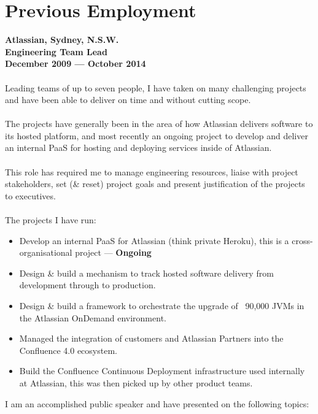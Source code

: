 \documentclass[a4paper]{article}
\begin{document}
\section*{Previous Employment}
\textbf{Atlassian, Sydney, N.S.W.\\Engineering Team Lead\\December 2009 --- October 2014}\\\\
Leading teams of up to seven people, I have taken on many challenging projects and have been able to deliver on time and without cutting scope.
\\\\The projects have generally been in the area of how Atlassian delivers software to its hosted platform, and most recently an ongoing project to develop and deliver an internal PaaS for hosting and deploying services inside of Atlassian.
\\\\
This role has required me to manage engineering resources, liaise with project stakeholders, set (\& reset) project goals and present justification of the projects to executives.
\\\\
The projects I have run:
\begin{itemize}
\item Develop an internal PaaS for Atlassian (think private Heroku), this is a cross-organisational project --- \textbf{Ongoing}
\item Design \& build a mechanism to track hosted software delivery from development through to production.
\item Design \& build a framework to orchestrate the upgrade of ~90,000 JVMs in the Atlassian OnDemand environment.
\item Managed the integration of customers and Atlassian Partners into the Confluence 4.0 ecosystem.
\item Build the Confluence Continuous Deployment infrastructure used internally at Atlassian, this was then picked up by other product teams.
\end{itemize}
I am an accomplished public speaker and have presented on the following topics:
\end{document}
